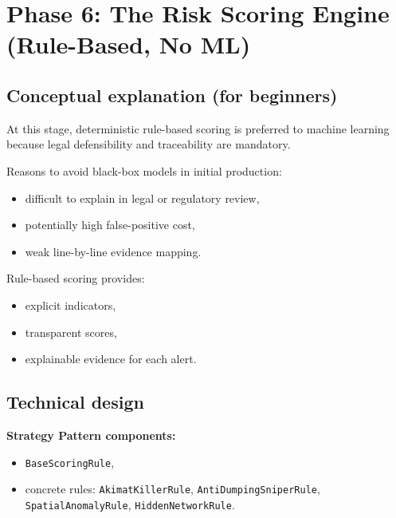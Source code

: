 \documentclass[11pt,a4paper]{article}
\begin{document}

\section{Phase 6: The Risk Scoring Engine (Rule-Based, No ML)}

\subsection{Conceptual explanation (for beginners)}
\begin{conceptbox}
At this stage, deterministic rule-based scoring is preferred to machine learning because legal defensibility and traceability are mandatory.

Reasons to avoid black-box models in initial production:
\begin{itemize}[leftmargin=1.4em]
  \item difficult to explain in legal or regulatory review,
  \item potentially high false-positive cost,
  \item weak line-by-line evidence mapping.
\end{itemize}

Rule-based scoring provides:
\begin{itemize}[leftmargin=1.4em]
  \item explicit indicators,
  \item transparent scores,
  \item explainable evidence for each alert.
\end{itemize}
\end{conceptbox}

\subsection{Technical design}
\textbf{Strategy Pattern components:}
\begin{itemize}[leftmargin=1.4em]
  \item \texttt{BaseScoringRule},
  \item concrete rules:
    \texttt{AkimatKillerRule},
    \texttt{AntiDumpingSniperRule},
    \texttt{SpatialAnomalyRule},
    \texttt{HiddenNetworkRule}.
\end{itemize}
\end{document}
